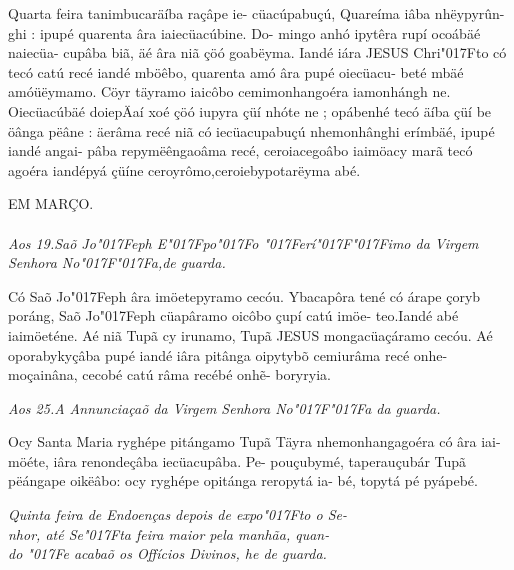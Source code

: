 \documentclass[openany,titlepage,12pt]{book}
\newcommand{\lgS}{\char"017F}
\newcommand{\lgSS}{\char"017F\char"017F}
\begin{document}
{Quarta feira tanimbucaräíba raçâpe ie-
cüacúpabuçú, Quareíma iâba nhëypyrûn-
ghi : ipupé quarenta âra iaiecüacúbine. Do-
mingo anhó ipytêra rupí ocoábäé naiecüa-
cupâba biã, äé âra niã çöó goabëyma. Iandé
iára JESUS Chri\lgS to  có tecó catú recé iandé
mböêbo, quarenta amó âra pupé oiecüacu-
beté mbäé amóüëymamo. Cöyr täyramo
iaicôbo cemimonhangoéra iamonhángh ne.
Oiecüacúbäé doiepÄaí xoé çöó iupyra çüí
nhóte ne ; opábenhé tecó äíba çüí be öânga
pëâne : äerâma recé niã có iecüacupabuçú
nhemonhânghi erímbäé, ipupé iandé angai-
pâba repymëêngaoâma recé, ceroiacegoâbo
iaimöacy marã tecó agoéra iandépyá çüíne
ceroyrômo,ceroiebypotarëyma abé.}

\begin{center}
    {EM MARÇO.\\}
    \textit{\small \\Aos 19.Saõ Jo\lgS eph E\lgS po\lgS o
    \lgS erí\lgSS imo da Virgem\\
    Senhora No\lgSS a,de guarda.}
\end{center}

{\hspace*{-2ex}Có Saõ Jo\lgS eph âra imöetepyramo cecóu.
Ybacapôra tené có árape çoryb poráng, Saõ
Jo\lgS eph cüapâramo oicôbo çupí catú imöe-
teo.Iandé abé iaimöeténe. Aé niã Tupã cy
irunamo, Tupã JESUS mongacüaçáramo\linebreak
cecóu. Aé oporabykyçâba pupé iandé iâra
pitânga oipytybõ cemiurâma recé onhe-\linebreak
moçainâna, cecobé catú râma recébé onh\~e-
boryryia.}

\begin{center}
    \textit{\small Aos 25.A Annunciaçaõ da Virgem Senhora No\lgSS a
    da guarda.}
\end{center}

{\hspace*{-2ex}Ocy Santa Maria ryghépe pitángamo\linebreak
Tupã Täyra nhemonhangagoéra có âra iai-
möéte, iâra renondeçâba iecüacupâba. Pe-
pouçubymé, taperauçubár Tupã pëángape
oikëâbo: ocy ryghépe opitánga reropytá ia-
bé, topytá pé pyápebé.}
\newpage
\begin{center}
    \textit{\small \hspace*{-2ex}Quinta feira de Endoenças depois de expo\lgS to o Se-\\
    \hspace*{-2ex}nhor, até Se\lgS ta feira maior pela manhãa, quan-\\
    do \lgS e acabaõ os Offícios Divinos, he de guarda.
    }
\end{center}
\end{document}
